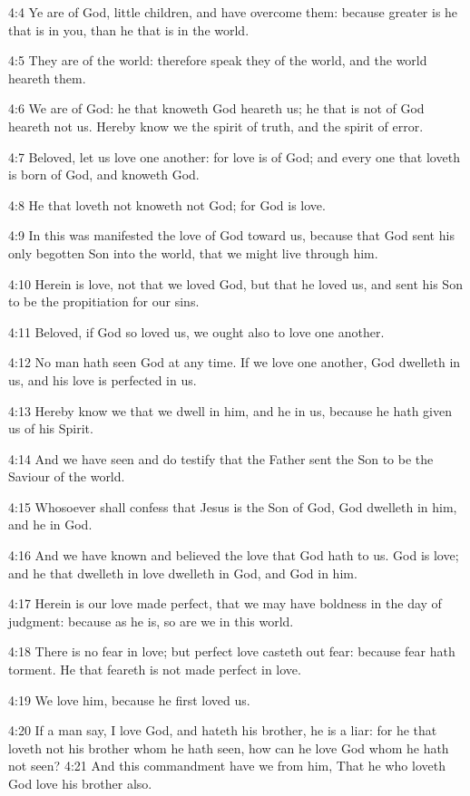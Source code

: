4:4 Ye are of God, little children, and have overcome them: because
greater is he that is in you, than he that is in the world.

4:5 They are of the world: therefore speak they of the world, and the
world heareth them.

4:6 We are of God: he that knoweth God heareth us; he that is not of
God heareth not us. Hereby know we the spirit of truth, and the spirit
of error.

4:7 Beloved, let us love one another: for love is of God; and every
one that loveth is born of God, and knoweth God.

4:8 He that loveth not knoweth not God; for God is love.

4:9 In this was manifested the love of God toward us, because that God
sent his only begotten Son into the world, that we might live through
him.

4:10 Herein is love, not that we loved God, but that he loved us, and
sent his Son to be the propitiation for our sins.

4:11 Beloved, if God so loved us, we ought also to love one another.

4:12 No man hath seen God at any time. If we love one another, God
dwelleth in us, and his love is perfected in us.

4:13 Hereby know we that we dwell in him, and he in us, because he
hath given us of his Spirit.

4:14 And we have seen and do testify that the Father sent the Son to
be the Saviour of the world.

4:15 Whosoever shall confess that Jesus is the Son of God, God
dwelleth in him, and he in God.

4:16 And we have known and believed the love that God hath to us. God
is love; and he that dwelleth in love dwelleth in God, and God in him.

4:17 Herein is our love made perfect, that we may have boldness in the
day of judgment: because as he is, so are we in this world.

4:18 There is no fear in love; but perfect love casteth out fear:
because fear hath torment. He that feareth is not made perfect in
love.

4:19 We love him, because he first loved us.

4:20 If a man say, I love God, and hateth his brother, he is a liar:
for he that loveth not his brother whom he hath seen, how can he love
God whom he hath not seen?  4:21 And this commandment have we from
him, That he who loveth God love his brother also.

